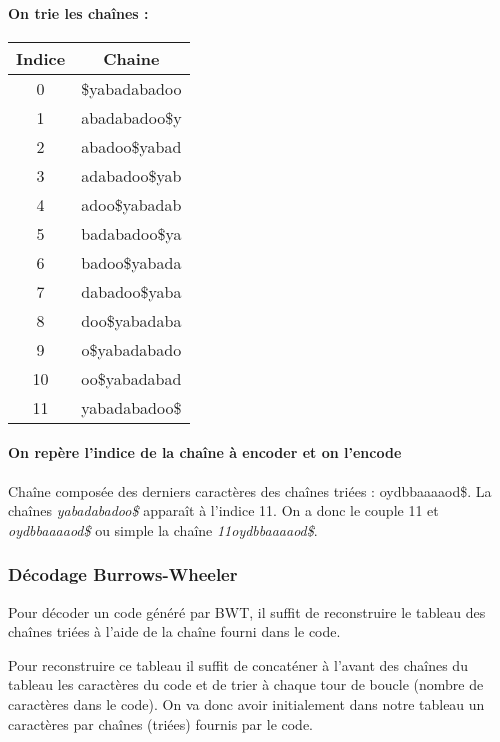 \paragraph{On trie les chaînes :}


\begin{tabular}{|c|c|}
    \hline
    Indice & Chaine \\
    \hline
    0 & \$yabadabadoo\\
    \hline
    1 & abadabadoo\$y  \\
    \hline
    2 & abadoo\$yabad\\
    \hline
    3 & adabadoo\$yab\\
    \hline
    4 & adoo\$yabadab\\
    \hline
    5 & badabadoo\$ya\\
    \hline
    6 & badoo\$yabada\\
    \hline
    7 & dabadoo\$yaba\\
    \hline
    8 & doo\$yabadaba\\
    \hline
    9 & o\$yabadabado\\
    \hline
    10 & oo\$yabadabad\\
    \hline
    11 & yabadabadoo\$\\
    \hline
\end{tabular}

\paragraph{On repère l'indice de la chaîne à encoder et on l'encode}

\par Chaîne composée des derniers caractères des chaînes triées : oydbbaaaaod\$.
La chaînes \textit{yabadabadoo\$} apparaît à l'indice 11. On a donc le couple 11 et \textit{oydbbaaaaod\$} ou  simple la chaîne \textit{11oydbbaaaaod\$}.

\subsubsection{Décodage Burrows-Wheeler}

\par Pour décoder un code généré par BWT, il suffit de reconstruire le tableau des chaînes triées à l'aide de la chaîne fourni dans le code.

\par Pour reconstruire ce tableau il suffit de concaténer à l'avant des chaînes du tableau les caractères du code et de trier à chaque tour de boucle (nombre de caractères dans le code). On va donc avoir initialement dans notre tableau un caractères par chaînes (triées) fournis par le code. 

